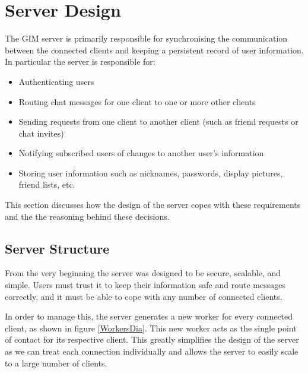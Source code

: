 \section{Server Design}
\label{ServerDesign}

The GIM server is primarily responsible for synchronising the communication between the connected clients and keeping a persistent record of user information. In particular the server is responsible for:

\begin{itemize}
    \item{Authenticating users}
    \item{Routing chat messages for one client to one or more other clients}
    \item{Sending requests from one client to another client (such as friend requests or chat invites)}
    \item{Notifying subscribed users of changes to another user's information}
    \item{Storing user information such as nicknames, passwords, display pictures, friend lists, etc.}
\end{itemize}

This section discusses how the design of the server copes with these requirements and the the reasoning behind these decisions.

\subsection{Server Structure}

From the very beginning the server was designed to be secure, scalable, and simple. Users must trust it to keep their information safe and route messages correctly, and it must be able to cope with any number of connected clients.

In order to manage this, the server generates a new worker for every connected client, as shown in figure \ref{WorkersDia}. This new worker acts as the single point of contact for its respective client. This greatly simplifies the design of the server as we can treat each connection individually and allows the server to easily scale to a large number of clients.

